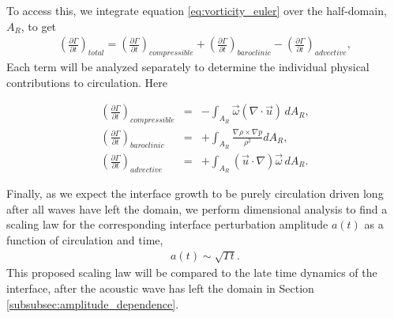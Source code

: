 To access this, we integrate equation \eqref{eq:vorticity_euler} over
the half-domain, $A_R$, to get
\begin{align} \label{eq:circulation_generation}
  \left(\frac{\partial \Gamma}{\partial t}\right)_{total} =%
  \left(\frac{\partial \Gamma}{\partial t}\right)_{compressible} + \left(\frac{\partial \Gamma}{\partial t}\right)_{baroclinic} - \left(\frac{\partial \Gamma}{\partial t}\right)_{advective},
\end{align}
%
Each term will be analyzed separately to determine the individual
physical contributions to circulation. Here
%
\addtocounter{equation}{-1}
\begin{subequations}\label{eq:circulation_generation_components}%
  \begin{align}%
    &\left(\frac{\partial \Gamma}{\partial t}\right)_{compressible} &=& -\int_{A_R} \vec{\omega}\left(\nabla\cdot\vec{u}\right) \, dA_R,&\\
    &\left(\frac{\partial \Gamma}{\partial t}\right)_{baroclinic} &=& +\int_{A_R} \frac{\nabla\rho\times\nabla p}{\rho^2} dA_R,&\\
    &\left(\frac{\partial \Gamma}{\partial t}\right)_{advective} &=& +\int_{A_R} \left(\vec{u}\cdot\nabla\right)\vec{\omega} \, dA_R.&
  \end{align}
\end{subequations}
%

Finally, as we expect the interface growth to be purely circulation driven
long after all waves have left the domain, we perform dimensional
analysis to find a scaling law for the corresponding interface
perturbation amplitude $a(t)$ as a function of circulation and time,
\begin{align} \label{eq:intf_circ_scaling}
  a(t) \sim \sqrt{\Gamma t}.
\end{align}
This proposed scaling law will be compared to the late time dynamics
of the interface, after the acoustic wave has left the domain in
Section \ref{subsubsec:amplitude_dependence}. \DIFdelbegin %


